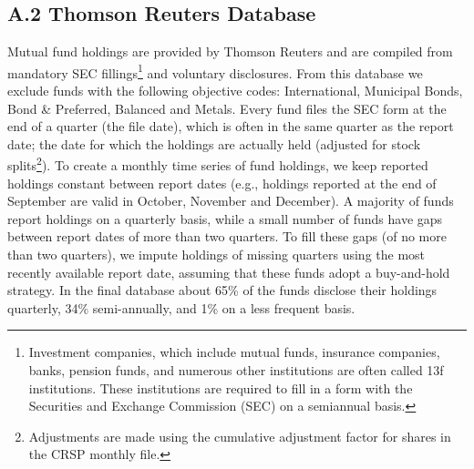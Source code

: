 \subsection*{A.2 \hspace{0.1cm} Thomson Reuters Database}
 Mutual fund holdings are provided by Thomson Reuters and are compiled from mandatory SEC fillings\footnote{Investment companies, which include mutual funds, insurance companies, banks, pension funds, and numerous other institutions are often called 13f institutions. These institutions are required to fill in a form with the Securities and Exchange Commission (SEC) on a semiannual basis.} and voluntary disclosures. From this database we exclude funds with the following objective codes: International, Municipal Bonds, Bond \& Preferred, Balanced and Metals. Every fund files the SEC form at the end of a quarter (the file date), which is often in the same quarter as the report date; the date for which the holdings are actually held (adjusted for stock splits\footnote{Adjustments are made using the cumulative adjustment factor for shares in the CRSP monthly file.}). To create a monthly time series of fund holdings, we keep reported holdings constant between report dates (e.g., holdings reported at the end of September are valid in October, November and December). A majority of funds report holdings on a quarterly basis, while a small number of funds have gaps between report dates of more than two quarters. To fill these gaps (of no more than two quarters), we impute holdings of missing quarters using the most recently available report date, assuming that these funds adopt a buy-and-hold strategy. In the final database about 65\% of the funds disclose their holdings quarterly, 34\% semi-annually, and 1\% on a less frequent basis.  



